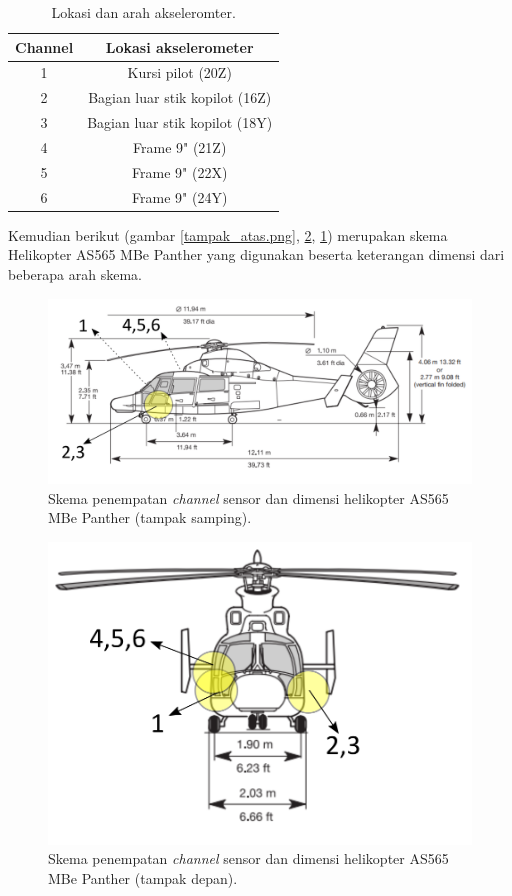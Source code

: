 \begin{longtable}{|c|c|}
	\caption{Lokasi dan arah akseleromter.}
	\label{tb:lokasiakselero}                        	\\
	\hline
	\textbf{Channel} & \textbf{Lokasi akselerometer} 	\\
	\hline
	1            	 & Kursi pilot (20Z)             	\\
	\hline
	2			     & Bagian luar stik kopilot (16Z)   \\
	\hline
	3				 & Bagian luar stik kopilot	(18Y)   \\
	\hline
	4				 & Frame 9" (21Z)                   \\
	\hline
	5				 & Frame 9" (22X)					\\
	\hline
	6				 & Frame 9" (24Y)					\\
	\hline
\end{longtable}

Kemudian berikut (gambar \ref{tampak_atas.png}, \ref{tampak_depan.png}, \ref{tampak_samping.png}) merupakan skema Helikopter AS565 MBe Panther yang digunakan beserta keterangan dimensi dari beberapa arah skema.

\begin{figure}[H]
	\centering
	\includegraphics[width=0.8\linewidth]{gambar/tampak_samping.png}
	\caption{Skema penempatan \textit{channel} sensor dan dimensi helikopter AS565 MBe Panther (tampak samping).}
	\label{tampak_samping.png}
\end{figure}

\begin{figure}[H]
	\centering
	\includegraphics[width=0.6\linewidth]{gambar/tampak_depan.png}
	\caption{Skema penempatan \textit{channel} sensor dan dimensi helikopter AS565 MBe Panther (tampak depan).}
	\label{tampak_depan.png}
\end{figure}

